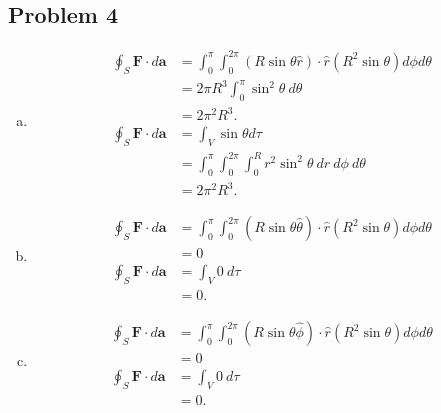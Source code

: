 \documentclass[10pt]{mypackage}
\begin{document}
\subsection{Problem 4}%
\begin{enumerate}[(a)]
  \item 
    \begin{align*}
      \oint_{S}\mathbf{F}\cdot d\mathbf{a} &= \int_{0}^{\pi}\int_{0}^{2\pi}\left(R\sin\theta\hat{r}\right)\cdot \hat{r} \left(R^2\sin\theta\right)d\phi d\theta\\
                                           &= 2\pi R^3\int_{0}^{\pi}\sin^2\theta\:d\theta\\
                                           &= 2\pi^2R^3.\\
      \oint_{S}\mathbf{F}\cdot d\mathbf{a} &= \int_{V}\sin\theta d\tau\\
                                           &= \int_{0}^{\pi}\int_{0}^{2\pi}\int_{0}^{R} r^2\sin^2\theta\:dr\:d\phi\:d\theta\\
                                           &= 2\pi^2R^3.
    \end{align*}
  \item 
    \begin{align*}
      \oint_{S}\mathbf{F}\cdot d\mathbf{a} &= \int_{0}^{\pi}\int_{0}^{2\pi}\left(R\sin\theta \hat{\theta}\right)\cdot \hat{r}\left(R^2\sin\theta\right)d\phi d\theta\\
                                           &= 0\\
      \oint_{S}\mathbf{F}\cdot d\mathbf{a} &= \int_{V}0\:d\tau\\
                                           &= 0.
    \end{align*}
  \item 
    \begin{align*}
      \oint_{S}\mathbf{F}\cdot d\mathbf{a} &= \int_{0}^{\pi}\int_{0}^{2\pi}\left(R\sin\theta \hat{\phi}\right)\cdot \hat{r}\left(R^2\sin\theta\right)d\phi d\theta\\
                                           &= 0\\
      \oint_{S}\mathbf{F}\cdot d\mathbf{a} &= \int_{V}0\:d\tau\\
                                           &= 0.
    \end{align*}
\end{enumerate}
\end{document}
